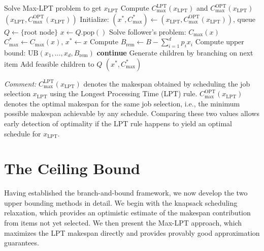 \begin{algorithm}
\caption{Branch-and-Bound for Bilevel Problem}
\label{alg:bnb}
\begin{algorithmic}[1]
\State Solve Max-LPT problem to get $x_{\text{LPT}}$
\State Compute $C_{\max}^{\text{LPT}}(x_{\text{LPT}})$ and $C_{\max}^{\text{OPT}}(x_{\text{LPT}})$
    \State \Return $(x_{\text{LPT}}, C_{\max}^{\text{OPT}}(x_{\text{LPT}}))$ 
\EndIf
\State Initialize: $(x^*, C_{\max}^*) \gets (x_{\text{LPT}}, C_{\max}^{\text{OPT}}(x_{\text{LPT}}))$, queue $Q \gets \{$root node$\}$
    \State $x \gets Q.\text{pop}()$ 
        \State Solve follower's problem: $C_{\max}(x)$
            \State $C_{\max}^* \gets C_{\max}(x)$, $x^* \gets x$ 
        \EndIf
    \Else
        \State Compute $B_{\text{rem}} \gets B - \sum_{i=1}^{d} p_i x_i$ 
        \State Compute upper bound: $\text{UB}(x_1, \ldots, x_d, B_{\text{rem}})$
            \State \textbf{continue} 
        \EndIf
        \State Generate children by branching on next item
        \State Add feasible children to $Q$
    \EndIf
\EndWhile
\State \Return $(x^*, C_{\max}^*)$
\end{algorithmic}
\end{algorithm}

\vspace{0.5em}
\noindent\textit{Comment:} $C_{\max}^{\text{LPT}}(x_{\text{LPT}})$ denotes the makespan obtained by scheduling the job selection $x_{\text{LPT}}$ using the Longest Processing Time (LPT) rule. $C_{\max}^{\text{OPT}}(x_{\text{LPT}})$ denotes the optimal makespan for the same job selection, i.e., the minimum possible makespan achievable by any schedule. Comparing these two values allows early detection of optimality if the LPT rule happens to yield an optimal schedule for $x_{\text{LPT}}$.

\section{The Ceiling Bound}
\label{sec:bounding-subproblem}

Having established the branch-and-bound framework, we now develop the two upper bounding methods in detail. We begin with the knapsack scheduling relaxation, which provides an optimistic estimate of the makespan contribution from items not yet selected. We then present the Max-LPT approach, which maximizes the LPT makespan directly and provides provably good approximation guarantees.

